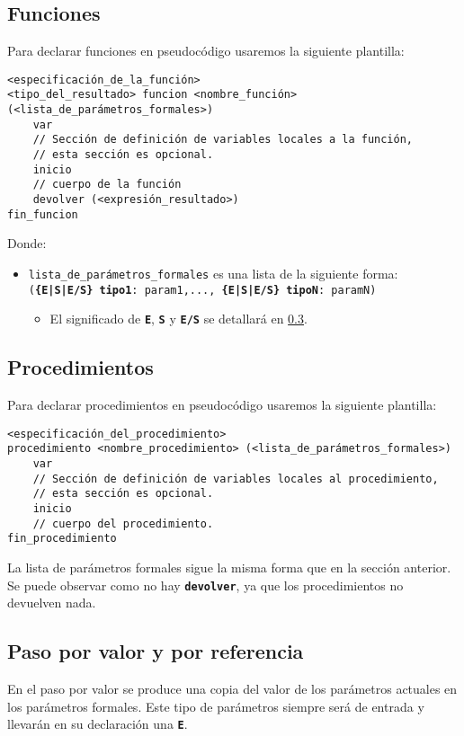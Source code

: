 \documentclass{article}
\newcommand{\pkeyword}[1]{\textcolor{azulpseudo}{\texttt{\textbf{#1}}}}
\begin{document}
\subsection{Funciones}
Para declarar funciones en pseudocódigo usaremos la siguiente plantilla:
\begin{lstlisting}[language = pseudocodigoesp]
<especificación_de_la_función>
<tipo_del_resultado> funcion <nombre_función> (<lista_de_parámetros_formales>)
    var
    // Sección de definición de variables locales a la función,
    // esta sección es opcional.
    inicio
    // cuerpo de la función
    devolver (<expresión_resultado>)
fin_funcion
\end{lstlisting}
Donde:
\begin{itemize}
\item \texttt{lista\_de\_parámetros\_formales} es una lista de la siguiente forma:\linebreak\newline\texttt{(\pkeyword{\{E|S|E/S\} tipo1}: param1,{\color{red}...}, \pkeyword{\{E|S|E/S\} tipoN}: paramN)}
  \begin{itemize} 
    \item El significado de \pkeyword{E}, \pkeyword{S} y \pkeyword{E/S} se detallará en \ref{subsec:pvr}.
    \end{itemize}
\end{itemize}
\pagebreak
\subsection{Procedimientos}
Para declarar procedimientos en pseudocódigo usaremos la siguiente plantilla:
\begin{lstlisting}[language = pseudocodigoesp]
<especificación_del_procedimiento>
procedimiento <nombre_procedimiento> (<lista_de_parámetros_formales>) 
    var
    // Sección de definición de variables locales al procedimiento,
    // esta sección es opcional.
    inicio
    // cuerpo del procedimiento.
fin_procedimiento
\end{lstlisting}
La lista de parámetros formales sigue la misma forma que en la sección anterior. Se puede observar como no hay \pkeyword{devolver}, ya que los procedimientos no devuelven nada.
\subsection{Paso por valor y por referencia}
\label{subsec:pvr}
En el paso por valor se produce una copia del valor de los parámetros actuales en los parámetros formales. Este tipo de parámetros siempre será de entrada y llevarán en su declaración una \pkeyword{E}.
\end{document}
